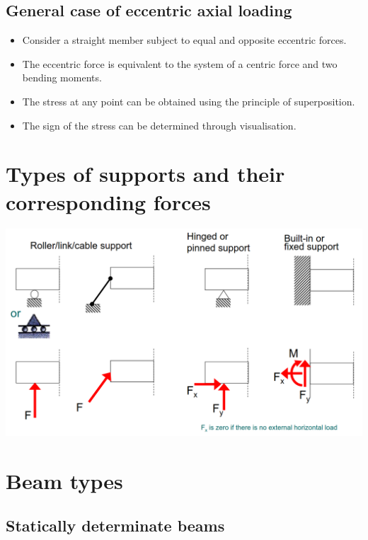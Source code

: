 \documentclass[11pt]{article}
\begin{document}
\subsection{General case of eccentric axial loading}
\label{sec:org6853d5e}
\begin{itemize}
\item Consider a straight member subject to equal and opposite eccentric forces.
\item The eccentric force is equivalent to the system of a centric force and two bending moments.
\item The stress at any point can be obtained using the principle of superposition.
\item The sign of the stress can be determined through visualisation.
\end{itemize}

\newpage

\section{Types of supports and their corresponding forces}
\label{sec:orgecdca68}
\begin{center}
\includegraphics[width=.9\linewidth]{./images/types-of-supports.png}
\end{center}

\section{Beam types}
\label{sec:org67ed69c}

\subsection{Statically determinate beams}
\label{sec:org3124273}
\end{document}
